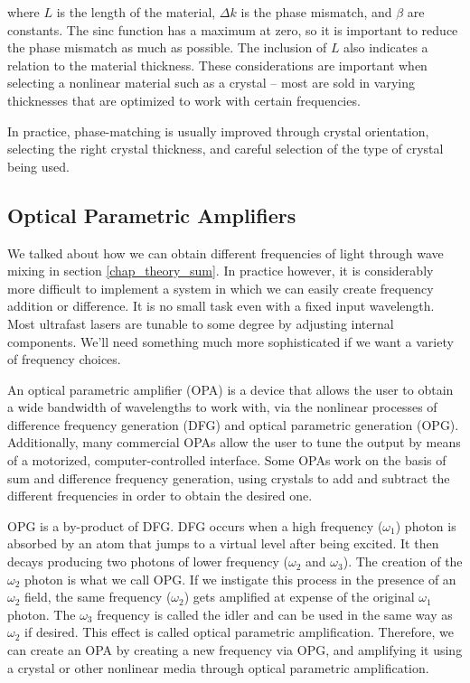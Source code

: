 \documentclass[10pt]{article}
\begin{document}
where $L$ is the length of the material, $\Delta k$ is the phase mismatch, and $\beta$ are constants. The sinc function has a maximum at zero, so it is important to reduce the phase mismatch as much as possible. The inclusion of $L$ also indicates a relation to the material thickness. These considerations are important when selecting a nonlinear material such as a crystal -- most are sold in varying thicknesses that are optimized to work with certain frequencies.

In practice, phase-matching is usually improved through crystal orientation, selecting the right crystal thickness, and careful selection of the type of crystal being used.

\subsection{Optical Parametric Amplifiers}
We talked about how we can obtain different frequencies of light through wave mixing in section \ref{chap_theory_sum}. In practice however, it is considerably more difficult to implement a system in which we can easily create frequency addition or difference. It is no small task even with a fixed input wavelength. Most ultrafast lasers are tunable to some degree by adjusting internal components. We'll need something much more sophisticated if we want a variety of frequency choices.

An optical parametric amplifier (OPA) is a device that allows the user to obtain a wide bandwidth of wavelengths to work with, via the nonlinear processes of difference frequency generation (DFG) and optical parametric generation (OPG). Additionally, many commercial OPAs allow the user to tune the output by means of a motorized, computer-controlled interface. Some OPAs work on the basis of sum and difference frequency generation, using crystals to add and subtract the different frequencies in order to obtain the desired one.

OPG is a by-product of DFG. DFG occurs when a high frequency ($\omega_{1}$) photon is absorbed by an atom that jumps to a virtual level after being excited. It then decays producing two photons of lower frequency ($\omega_{2}$ and $\omega_{3}$). The creation of the $\omega_{2}$ photon is what we call OPG. If we instigate this process in the presence of an $\omega_{2}$ field, the same frequency ($\omega_{2}$) gets amplified at expense of the original $\omega_{1}$ photon. The $\omega_{3}$ frequency is called the idler and can be used in the same way as $\omega_{2}$ if desired. This effect is called optical parametric amplification. Therefore, we can create an OPA by creating a new frequency via OPG, and amplifying it using a crystal or other nonlinear media through optical parametric amplification. 
\end{document}
